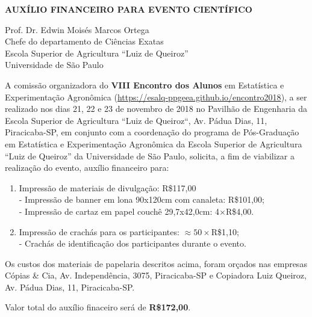\documentclass[a4paper, 11pt]{letter}
\title{}
\author{}
\date{}
\begin{document}
\begin{letter}{\bf AUXÍLIO FINANCEIRO PARA EVENTO CIENTÍFICO}

  \opening{
    \noindent
    Prof. Dr. Edwin Moisés Marcos Ortega \\[0.1cm]
    Chefe do departamento de Ciências Exatas\\
    Escola Superior de Agricultura ``Luiz de Queiroz''\\
    Universidade de São Paulo}

  \pagestyle{fancy}
  \thispagestyle{fancy}
  \vspace{0.5cm}

  A comissão organizadora do \textbf{VIII Encontro dos Alunos} em
  Estatística e Experimentação Agronômica
  (\url{https://esalq-ppgeea.github.io/encontro2018}), a ser realizado
  nos dias 21, 22 e 23 de novembro de 2018 no Pavilhão de Engenharia da
  Escola Superior de Agricultura ``Luiz de Queiroz``, Av. Pádua Dias,
  11, Piracicaba-SP, em conjunto com a coordenação do programa de
  Pós-Graduação em Estatística e Experimentação Agronômica da Escola
  Superior de Agricultura ``Luiz de Queiroz'' da Universidade de São
  Paulo, solicita, a fim de viabilizar a realização do evento, auxílio
  financeiro para:
  \begin{enumerate}
  \item Impressão de materiais de divulgação: R\$117,00\\
    - Impressão de banner em lona 90x120cm com canaleta: R\$101,00;\\
    - Impressão de cartaz em papel couchê 29,7x42,0cm: 4$\times$R\$4,00.
  \item Impressão de crachás para os participantes:
    $\approx 50 \times$R\$1,10;\\
    - Crachás de identificação dos participantes durante o evento.
  \end{enumerate}

  Os custos dos materiais de papelaria descritos acima, foram orçados
  nas empresas Cópias \& Cia, Av. Independência, 3075, Piracicaba-SP e
  Copiadora Luiz Queiroz, Av. Pádua Dias, 11, Piracicaba-SP.

  Valor total do auxílio finaceiro será de \textbf{R\$172,00}.


\end{letter}
\end{document}
